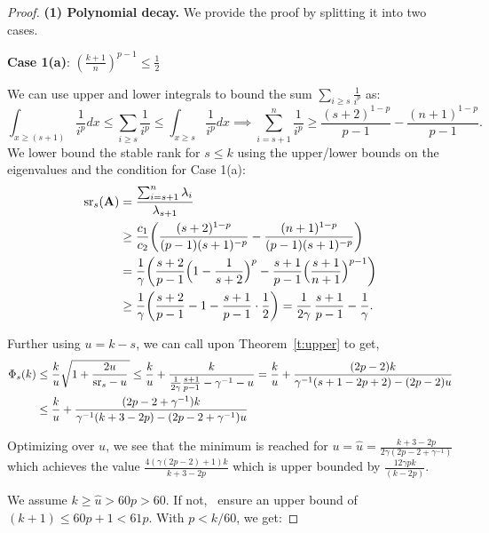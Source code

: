 \documentclass{article}
\begin{document}
\begin{proof}
  
  
  
\textbf{  (1) Polynomial decay.} We provide the proof by splitting it into two cases. 
  
  
  \textbf{Case 1(a)}: $\left(\frac{k+1}{n}\right)^{p-1} \leq \frac{1}{2} $
  
  We can use upper and lower integrals to bound the sum $\sum_{i\geq s}\frac{1}{i^p}$ as:
  \[ \int_{x\geq (s+1)}\frac{1}{i^p}dx \leq \sum_{i\geq
      s}\frac{1}{i^p} \leq \int_{x\geq s}\frac{1}{i^p}dx
    \implies \sum_{i=s+1}^n\frac{1}{i^p}
    \geq \frac{(s+2)^{1-p}}{p-1} -  \frac{(n+1)^{1-p}}{p-1}.\] 
  We lower bound the stable rank for $s\leq k$ using the upper/lower bounds on
  the eigenvalues and the condition for Case 1(a):
  \begin{align*}
    {\mathrm{sr}}_s(\mathbf A)&=\frac{\sum_{i=s+1}^n\lambda_i}{\lambda_{s+1}}\\
    &\geq
    \frac{c_1}{c_2}\bigg(\frac{(s+2)^{1-p}}{(p-1)(s+1)^{-p}}-
    \frac{(n+1)^{1-p}}{(p-1)(s+1)^{-p}}\bigg) \\
    &=\frac1\gamma\bigg(\frac{s+2}{p-1} \Big(1 - \frac1{s+2}\Big)^p
      -  \frac{s+1}{p-1}\Big(\frac{s+1}{n+1}\Big)^{p-1}\bigg)\\
    &\geq \frac1\gamma\bigg(\frac{s+2}{p-1} - 1
      -  \frac{s+1}{p-1}\cdot\frac12\bigg) = \frac1{2\gamma}\,\frac{s+1}{p-1}-\frac1\gamma.
  \end{align*}

  
  Further using $u =
  k-s$, we can call upon Theorem~\ref{t:upper} to get,  
  \begin{align*}
    \Phi_s(k) &\leq \frac{k}{u}\sqrt{1+\frac{2u}{ {\mathrm{sr}}_s-u }\,} \leq
    \frac{k}{u} + \frac{k}{  \frac{1}{2\gamma} \frac{s+1}{p-1} -
      \gamma^{-1} - u } = \frac{k}{u} + \frac{(2p-2)k}{
                \gamma^{-1}(s+1 - 2 p +2) - (2p-2)u } \\
    &\leq \frac{k}{u} +
    \frac{(2p-2 + \gamma^{-1})k}{   \gamma^{-1}(k+3 -2 p)  - (2p-2 +
    \gamma^{-1})u }
    \end{align*}
  
  Optimizing over $u$, we see that the minimum is reached for $u =
  \hat{u} = \frac{k+3-2p}{2\gamma(2p-2+\gamma^{-1})}$ which achieves the value
  $ \frac{4(\gamma(2p-2)+1)k}{k+3 -2 p}$ which is upper bounded by
  $\frac{12\gamma pk}{(k-2p)}$.   
  
  We assume $k \geq \hat{u} > 60p > 60$. If not,~\citet{pca-volume-sampling} ensure an upper bound of $(k+1) \leq 60p+1 < 61p$. With $p < k/60$, we get:
  

\end{proof}
\end{document}
